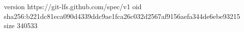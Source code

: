 version https://git-lfs.github.com/spec/v1
oid sha256:b221dc81eca090d4339ddc9ae1fca26c032d2567af9156aefa344de6ebe93215
size 340533
